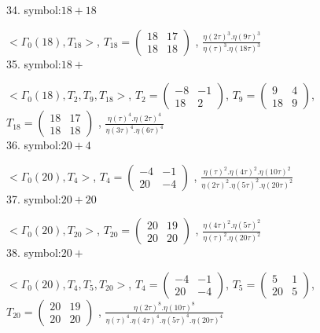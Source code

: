 34. symbol:$ 18+18 $

$ < \Gamma_0 ( 18 ), T_{18} >  $,
$
T_{18} = 
\left(
\begin{array}{cc}
18 & 17 \\
18 & 18
\end{array}
\right)
$
, {$ \frac{\eta(2\tau)^3 . \eta(9\tau)^3}{\eta(\tau)^3 . \eta(18\tau)^3} $}
\\

35. symbol:$ 18+ $

$ < \Gamma_0 ( 18 ), T_2, T_9, T_{18} >  $,
$
T_2 = 
\left(
\begin{array}{cc}
-8 & -1 \\
18 & 2
\end{array}
\right)
$,
$
T_9 = 
\left(
\begin{array}{cc}
9 & 4 \\
18 & 9
\end{array}
\right)
$,
$
T_{18} = 
\left(
\begin{array}{cc}
18 & 17 \\
18 & 18
\end{array}
\right)
$
, {$ \frac{\eta(\tau)^4 . \eta(2\tau)^4}{\eta(3\tau)^4 . \eta(6\tau)^4} $}
\\

36. symbol:$ 20+4 $

$ < \Gamma_0 ( 20 ), T_4 >  $,
$
T_4 = 
\left(
\begin{array}{cc}
-4 & -1 \\
20 & -4
\end{array}
\right)
$
, {$ \frac{\eta(\tau)^2 . \eta(4\tau)^2 . \eta(10\tau)^2}{\eta(2\tau)^2 . \eta(5\tau)^2 . \eta(20\tau)^2} $}
\\

37. symbol:$ 20+20 $

$ < \Gamma_0 ( 20 ), T_{20} >  $,
$
T_{20} = 
\left(
\begin{array}{cc}
20 & 19 \\
20 & 20
\end{array}
\right)
$
, {$ \frac{\eta(4\tau)^2 . \eta(5\tau)^2}{\eta(\tau)^2 . \eta(20\tau)^2} $}
\\

38. symbol:$ 20+ $

$ < \Gamma_0 ( 20 ), T_4, T_5, T_{20} >  $,
$
T_4 = 
\left(
\begin{array}{cc}
-4 & -1 \\
20 & -4
\end{array}
\right)
$,
$
T_5 = 
\left(
\begin{array}{cc}
5 & 1 \\
20 & 5
\end{array}
\right)
$,
$
T_{20} = 
\left(
\begin{array}{cc}
20 & 19 \\
20 & 20
\end{array}
\right)
$
, {$ \frac{\eta(2\tau)^8 . \eta(10\tau)^8}{\eta(\tau)^4 .\eta(4\tau)^4 .\eta(5\tau)^4. \eta(20\tau)^4} $}
\\

